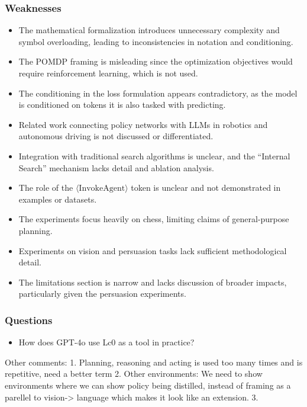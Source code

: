 \documentclass{article}
\theoremstyle{plain}
\theoremstyle{definition}
\theoremstyle{remark}
\begin{document}
\subsubsection*{Weaknesses}

\begin{itemize}
    \item The mathematical formalization introduces unnecessary complexity and symbol overloading, leading to inconsistencies in notation and conditioning.
    \item The POMDP framing is misleading since the optimization objectives would require reinforcement learning, which is not used.
    \item The conditioning in the loss formulation appears contradictory, as the model is conditioned on tokens it is also tasked with predicting.
    \item Related work connecting policy networks with LLMs in robotics and autonomous driving is not discussed or differentiated.
    \item Integration with traditional search algorithms is unclear, and the ``Internal Search'' mechanism lacks detail and ablation analysis.
    \item The role of the $\langle \text{InvokeAgent} \rangle$ token is unclear and not demonstrated in examples or datasets.
    \item The experiments focus heavily on chess, limiting claims of general-purpose planning.
    \item Experiments on vision and persuasion tasks lack sufficient methodological detail.
    \item The limitations section is narrow and lacks discussion of broader impacts, particularly given the persuasion experiments.
\end{itemize}

\subsubsection*{Questions}

\begin{itemize}
    \item How does GPT-4o use Lc0 as a tool in practice?
\end{itemize}




Other comments:
1. Planning, reasoning and acting is used too many times and is repetitive, need a better term
2. Other environments: We need to show environments where we can show policy being distilled, instead of framing as a parellel to vision-> language which makes it look like an extension.
3. 
\end{document}
